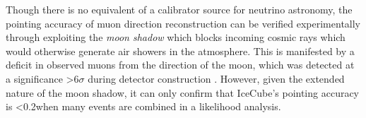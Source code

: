 Though there is no equivalent of a calibrator source for neutrino astronomy, the pointing accuracy of muon direction reconstruction can be verified experimentally through exploiting the \emph{moon shadow} which blocks incoming cosmic rays which would otherwise generate air showers in the atmosphere. This is manifested by a deficit in observed muons from the direction of the moon, which was detected at a significance >6$\sigma$ during detector construction . However, given the extended nature of the moon shadow, it can only confirm that IceCube's pointing accuracy is <0.2\arcdeg when many events are combined in a likelihood analysis.

%
%
%
